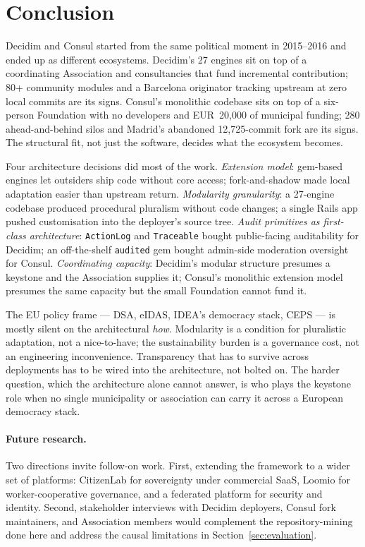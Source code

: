 \documentclass[11pt,a4paper]{article}
\begin{document}
\section{Conclusion}\label{sec:conclusion}

Decidim and Consul started from the same political moment in 2015--2016 and ended up as different ecosystems. Decidim's 27 engines sit on top of a coordinating Association and consultancies that fund incremental contribution; 80+ community modules and a Barcelona originator tracking upstream at zero local commits are its signs. Consul's monolithic codebase sits on top of a six-person Foundation with no developers and EUR~20{,}000 of municipal funding; 280 ahead-and-behind silos and Madrid's abandoned 12{,}725-commit fork are its signs. The structural fit, not just the software, decides what the ecosystem becomes.

Four architecture decisions did most of the work. \emph{Extension model}: gem-based engines let outsiders ship code without core access; fork-and-shadow made local adaptation easier than upstream return. \emph{Modularity granularity}: a 27-engine codebase produced procedural pluralism without code changes; a single Rails app pushed customisation into the deployer's source tree. \emph{Audit primitives as first-class architecture}: \texttt{ActionLog} and \texttt{Traceable} bought public-facing auditability for Decidim; an off-the-shelf \texttt{audited} gem bought admin-side moderation oversight for Consul. \emph{Coordinating capacity}: Decidim's modular structure presumes a keystone and the Association supplies it; Consul's monolithic extension model presumes the same capacity but the small Foundation cannot fund it.

The EU policy frame --- DSA, eIDAS, IDEA's democracy stack, CEPS --- is mostly silent on the architectural \emph{how}. Modularity is a condition for pluralistic adaptation, not a nice-to-have; the sustainability burden is a governance cost, not an engineering inconvenience. Transparency that has to survive across deployments has to be wired into the architecture, not bolted on. The harder question, which the architecture alone cannot answer, is who plays the keystone role when no single municipality or association can carry it across a European democracy stack.

\paragraph{Future research.}
Two directions invite follow-on work. First, extending the framework to a wider set of platforms: CitizenLab for sovereignty under commercial SaaS, Loomio for worker-cooperative governance, and a federated platform for security and identity. Second, stakeholder interviews with Decidim deployers, Consul fork maintainers, and Association members would complement the repository-mining done here and address the causal limitations in Section~\ref{sec:evaluation}.
\end{document}
